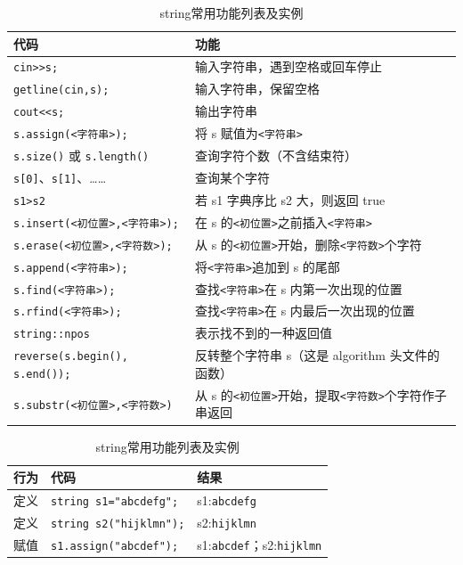 \documentclass[UTF8]{ctexart}
\begin{document}
\begin{table}[p]
    \centering
    \small
    \caption{string常用功能列表及实例}\label{tab:string常用功能列表}
    \begin{tabular}{ll}
    \toprule
        \textbf{代码} & \textbf{功能} \\
    \midrule
        \verb!cin>>s;! & 输入字符串，遇到空格或回车停止\\
        \verb!getline(cin,s);! & 输入字符串，保留空格 \\
        \verb!cout<<s;! & 输出字符串 \\
        \verb!s.assign(<字符串>);! & 将 s 赋值为\verb!<字符串>! \\
        \verb!s.size()! 或 \verb!s.length()! & 查询字符个数（不含结束符） \\
        \verb!s[0]!、\verb!s[1]!、…… & 查询某个字符 \\
        \verb!s1>s2! & 若 s1 字典序比 s2 大，则返回 true \\
        \verb!s.insert(<初位置>,<字符串>);! & 在 s 的\verb!<初位置>!之前插入\verb!<字符串>! \\
        \verb!s.erase(<初位置>,<字符数>);! & 从 s 的\verb!<初位置>!开始，删除\verb!<字符数>!个字符 \\
        \verb!s.append(<字符串>);! & 将\verb!<字符串>!追加到 s 的尾部 \\
        \verb!s.find(<字符串>);! & 查找\verb!<字符串>!在 s 内第一次出现的位置 \\
        \verb!s.rfind(<字符串>);! & 查找\verb!<字符串>!在 s 内最后一次出现的位置 \\
        \verb!string::npos! & 表示找不到的一种返回值 \\
        \verb!reverse(s.begin(), s.end());! & 反转整个字符串 s（这是 algorithm 头文件的函数）\\
        \verb!s.substr(<初位置>,<字符数>)! & 从 s 的\verb!<初位置>!开始，提取\verb!<字符数>!个字符作子串返回 \\
    \bottomrule
    \end{tabular}
    \begin{tabular}{lll}
    \toprule
        \textbf{行为} & \textbf{代码} & \textbf{结果} \\
    \midrule
        定义 & \verb!string s1="abcdefg";! & s1:\verb!abcdefg! \\
        定义 & \verb!string s2("hijklmn");! & s2:\verb!hijklmn! \\
        赋值 & \verb!s1.assign("abcdef");! & s1:\verb!abcdef!；s2:\verb!hijklmn! \\

\end{tabular}
\end{table}
\end{document}
